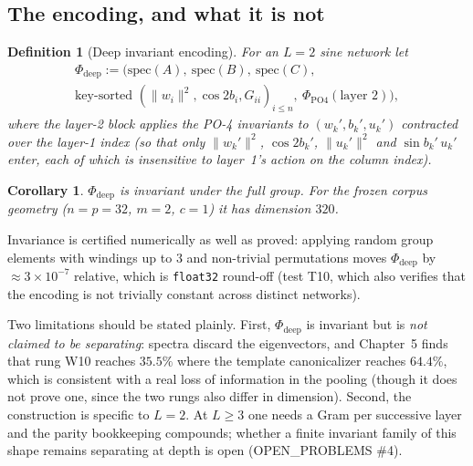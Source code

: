 \documentclass[11pt]{article}
\newtheorem{corollary}[theorem]{Corollary}
\newtheorem{definition}[theorem]{Definition}
\begin{document}
\subsection{The encoding, and what it is not}

\begin{definition}[Deep invariant encoding]
For an $L=2$ sine network let
\begin{multline}
\Phi_{\mathrm{deep}} := \bigl(\mathrm{spec}(A),\ \mathrm{spec}(B),\ \mathrm{spec}(C),\\
\text{key-sorted } (\|w_i\|^2,\cos 2b_i, G_{ii})_{i\le n},\
\Phi_{\mathrm{PO4}}(\text{layer }2)\bigr),
\end{multline}
where the layer-2 block applies the PO-4 invariants to $(w_k',b_k',u_k')$ contracted over the
layer-1 index (so that only $\|w_k'\|^2$, $\cos 2b_k'$, $\|u_k'\|^2$ and $\sin b_k'\,u_k'$ enter,
each of which is insensitive to layer~1's action on the column index).
\end{definition}

\begin{corollary}
$\Phi_{\mathrm{deep}}$ is invariant under the full group. For the frozen corpus geometry
($n=p=32$, $m=2$, $c=1$) it has dimension $320$.
\end{corollary}

Invariance is certified numerically as well as proved: applying random group elements with windings
up to $3$ and non-trivial permutations moves $\Phi_{\mathrm{deep}}$ by $\approx 3\times 10^{-7}$
relative, which is \texttt{float32} round-off (test T10, which also verifies that the encoding is
not trivially constant across distinct networks).

Two limitations should be stated plainly. First, $\Phi_{\mathrm{deep}}$ is invariant but is
\emph{not claimed to be separating}: spectra discard the eigenvectors, and Chapter~5 finds that
rung W10 reaches $35.5\%$ where the template canonicalizer reaches $64.4\%$, which is consistent
with a real loss of information in the pooling (though it does not prove one, since the two rungs
also differ in dimension). Second, the construction is specific to $L=2$. At $L\ge 3$ one needs a
Gram per successive layer and the parity bookkeeping compounds; whether a finite invariant family
of this shape remains separating at depth is open (OPEN\_PROBLEMS \#4).
\end{document}
